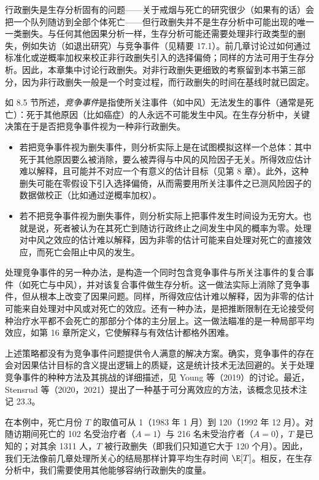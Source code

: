 
行政删失是生存分析固有的问题——关于戒烟与死亡的研究很少（如果有的话）会把一个队列随访到全部个体死亡——但行政删失并不是生存分析中可能出现的唯一一类删失。与任何其他因果分析一样，生存分析可能还需要处理非行政类型的删失，例如失访（如退出研究）与竞争事件（见精要 17.1）。前几章讨论过如何通过标准化或逆概率加权来校正非行政删失引入的选择偏倚；同样的方法可用于生存分析。因此，本章集中讨论行政删失。对非行政删失更细致的考察留到本书第三部分，因为非行政删失一般是一个时变过程，而行政删失的时间在基线时就已固定。

\begin{finepoint}[竞争事件]
如 8.5 节所述，\emph{竞争事件}是指使所关注事件（如中风）无法发生的事件（通常是死亡）：死于其他原因（比如癌症）的人永远不可能发生中风。在生存分析中，关键决策在于是否把竞争事件视为一种非行政删失。
\begin{itemize}
\item 若把竞争事件视为删失事件，则分析实际上是在试图模拟这样一个总体：其中死于其他原因要么被消除，要么被弄得与中风的风险因子无关。所得效应估计难以解释，且可能并不对应一个有意义的估计目标（见第 8 章）。此外，这种删失可能在零假设下引入选择偏倚，从而需要用所关注事件之已测风险因子的数据做校正（比如通过逆概率加权）。
\item 若不把竞争事件视为删失事件，则分析实际上把事件发生时间设为无穷大。也就是说，死者被认为在其死亡到随访行政终止之间发生中风的概率为零。处理对中风之效应的估计难以解释，因为非零的估计可能来自处理对死亡的直接效应，而死亡会阻止中风的发生。
\end{itemize}
处理竞争事件的另一种办法，是构造一个同时包含竞争事件与所关注事件的复合事件（如死亡与中风），并对该复合事件做生存分析。这一做法实际上消除了竞争事件，但从根本上改变了因果问题。同样，所得效应估计难以解释，因为非零的估计可能来自处理对中风或对死亡的效应。还有一种办法，是把推断限制在无论接受何种治疗水平都不会死亡的那部分个体的主分层上。这一做法瞄准的是一种局部平均效应，如第 16 章所定义，它使解释与有效估计都格外困难。

上述策略都没有为竞争事件问题提供令人满意的解决方案。确实，竞争事件的存在会对因果估计目标的含义提出逻辑上的质疑，这是统计技术无法回避的。关于处理竞争事件的种种方法及其挑战的详细描述，见 Young 等（2019）的讨论。最近，Stensrud 等（2020，2021）提出了一种基于可分离效应的方法，该概念见技术注记 23.3。
\end{finepoint}

在本例中，死亡月份 $T$ 的取值可从 1（1983 年 1 月）到 120（1992 年 12 月）。对随访期间死亡的 102 名受治疗者（$A=1$）与 216 名未受治疗者（$A=0$），$T$ 是已知的；对其余 1311 人，$T$ 被行政删失（即我们只知道它大于 120 个月）。因此，我们无法像前几章处理所关心的结局那样计算平均生存时间 $\E[T]$。相反，在生存分析中，我们需要使用其他能够容纳行政删失的度量。

